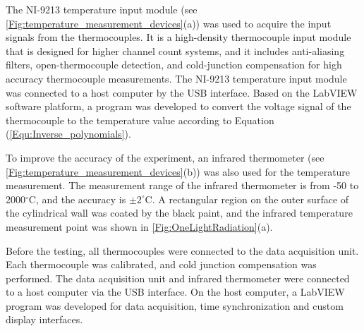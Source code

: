 
The NI-9213 temperature input module (see \ref{Fig:temperature_measurement_devices}(a)) was used to acquire the input signals from the thermocouples. It is a high-density thermocouple input module that is designed for higher channel count systems, and it includes anti-aliasing filters, open-thermocouple detection, and cold-junction compensation for high accuracy thermocouple measurements. 
The NI-9213 temperature input module was connected to a host computer by the USB interface. Based on the LabVIEW software platform, a program was developed to convert the voltage signal of the thermocouple to the temperature value according to Equation (\ref{Equ:Inverse_polynomials}).

To improve the accuracy of the experiment, an infrared thermometer (see \ref{Fig:temperature_measurement_devices}(b)) was also used for the temperature measurement.
The measurement range of the infrared thermometer is from -50 to 2000$^{\circ}$C, and the accuracy is $\pm2^{\circ}$C.
A rectangular region on the outer surface of the cylindrical wall was coated by the black paint, and the infrared temperature measurement point was shown in \ref{Fig:OneLightRadiation}(a).

Before the testing, all thermocouples were connected to the data acquisition unit. Each thermocouple was calibrated, and cold junction compensation was performed.
The data acquisition unit and infrared thermometer were connected to a host computer via the USB interface.
On the host computer, a LabVIEW program was developed for data acquisition, time synchronization and custom display interfaces.

